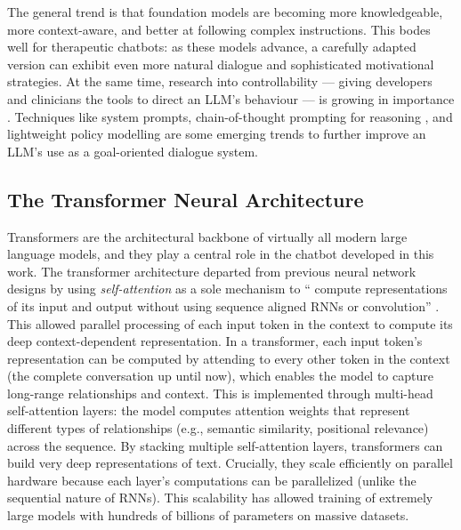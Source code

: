 The general trend is that foundation models are becoming more knowledgeable, more context-aware, and better at following complex instructions. This bodes well for therapeutic chatbots: as these models advance, a carefully adapted version can exhibit even more natural dialogue and sophisticated motivational strategies. At the same time, research into controllability --- giving developers and clinicians the tools to direct an LLM's behaviour --- is growing in importance \cite{fernandez-etal-2025-lamia}. Techniques like system prompts, chain-of-thought prompting for reasoning \cite{10.5555/3600270.3602070}, and lightweight policy modelling \cite{du-etal-2024-rewarding} are some emerging trends to further improve an LLM's use as a goal-oriented dialogue system.


\subsection{The Transformer Neural Architecture}
\label{ssec:transformers} 
Transformers are the architectural backbone of virtually all modern large language models, and they play a central role in the chatbot developed in this work. The transformer architecture \cite{vaswani2017attention} departed from previous neural network designs by using \emph{self-attention} as a sole mechanism to `` compute representations of its input and output without using sequence aligned RNNs or convolution'' \cite{vaswani2017attention}. This allowed parallel processing of each input token in the context to compute its deep context-dependent representation. In a transformer, each input token's representation can be computed by attending to every other token in the context (the complete conversation up until now), which enables the model to capture long-range relationships and context. This is implemented through multi-head self-attention layers: the model computes attention weights that represent different types of relationships (e.g., semantic similarity, positional relevance) across the sequence. By stacking multiple self-attention layers, transformers can build very deep representations of text. Crucially, they scale efficiently on parallel hardware because each layer's computations can be parallelized (unlike the sequential nature of RNNs). This scalability has allowed training of extremely large models with hundreds of billions of parameters on massive datasets.


